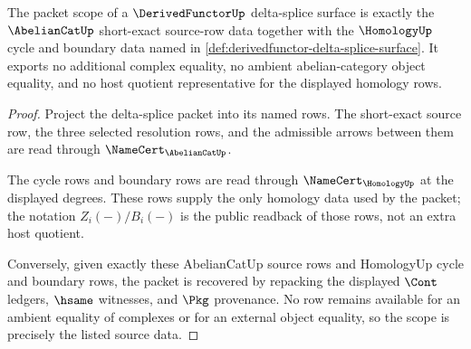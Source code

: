 \begin{theorem}\label{thm:derivedfunctor-short-exact-source-scope}
The packet scope of a $\DerivedFunctorUp$ delta-splice surface is exactly the $\AbelianCatUp$ short-exact source-row data together with the $\HomologyUp$ cycle and boundary data named in \autoref{def:derivedfunctor-delta-splice-surface}. It exports no additional complex equality, no ambient abelian-category object equality, and no host quotient representative for the displayed homology rows.
\end{theorem}
\begin{proof}
Project the delta-splice packet into its named rows. The short-exact source row, the three selected resolution rows, and the admissible arrows between them are read through $\NameCert_{\AbelianCatUp}$.

The cycle rows and boundary rows are read through $\NameCert_{\HomologyUp}$ at the displayed degrees. These rows supply the only homology data used by the packet; the notation $Z_i(-)/B_i(-)$ is the public readback of those rows, not an extra host quotient.

Conversely, given exactly these AbelianCatUp source rows and HomologyUp cycle and boundary rows, the packet is recovered by repacking the displayed $\Cont$ ledgers, $\hsame$ witnesses, and $\Pkg$ provenance. No row remains available for an ambient equality of complexes or for an external object equality, so the scope is precisely the listed source data.
\end{proof}

